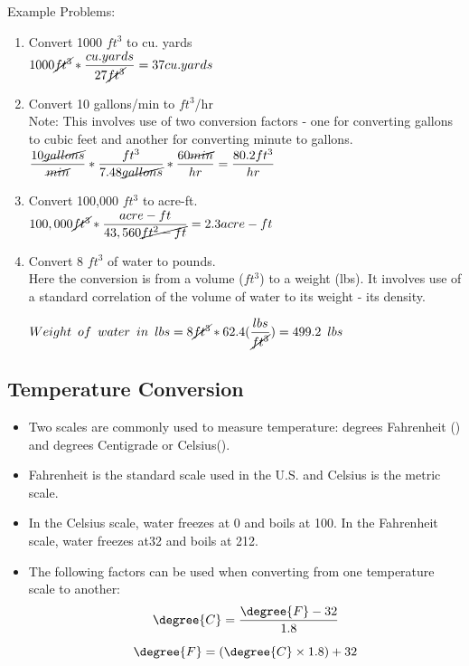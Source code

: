 Example Problems:\\
\begin{enumerate}
\item Convert 1000 $ft^3$ to cu. yards\\

$1000 \cancel{ft^3}*\dfrac{cu.yards}{27\cancel{ft^3}} = 37 cu.yards$

\item Convert 10 gallons/min to $ft^3$/hr\\
Note:  This involves use of two conversion factors - one for converting gallons to cubic feet and another for converting minute to gallons.\\ 
$\dfrac{10 \cancel{gallons}}{\cancel{min}}*  \dfrac{ft^3}{7.48 \cancel{gallons}}  * \dfrac{60 \cancel{min}}{hr}   = \dfrac{80.2ft^3}{hr}$


\item Convert 100,000 $ft^3$ to acre-ft.\\
$100,000 \cancel{ft^3} * \dfrac{acre-ft}{43,560 \cancel{ft^2-ft}} =  2.3 acre-ft$\\

\item Convert 8 $ft^3$ of water to pounds.\\
Here the conversion is from a volume ($ft^3$) to a weight (lbs).  It involves use of a standard correlation of the volume of water to its weight - its density. 

$Weight \enspace of \enspace water \enspace in \enspace lbs=8 \cancel{ft^3} *   62.4  (\dfrac{lbs}{\cancel{ft^3}}) = 499.2 \enspace lbs $\\

\end{enumerate}

\subsection{Temperature Conversion}
\begin{itemize}
\item Two scales are commonly used to measure temperature: degrees Fahrenheit () and degrees Centigrade or Celsius(). 
\item Fahrenheit is the standard scale used in the U.S. and Celsius is the metric scale. 
\item In the Celsius scale, water freezes at 0 and boils at 100. In the Fahrenheit scale, water freezes at32 and boils at 212. 
\item The following factors can be used when converting from one temperature scale to another:
$$\degree{C} = \dfrac{\degree{F}-32}{1.8}$$

$$\degree{F}=(\degree{C} \times 1.8)+32$$
\end{itemize}


